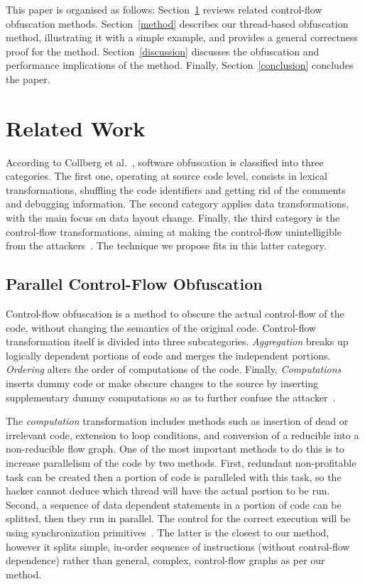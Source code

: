 \documentclass[3p,times,procedia,twocolumn,letterpaper]{elsarticle}
\begin{document}
This paper is organised as follows: Section~\ref{related} reviews related control-flow obfuscation methods. Section~\ref{method} describes our thread-based obfuscation method, illustrating it with a simple example, and provides a general correctness proof for the method. Section~\ref{discussion} discusses the obfuscation and performance implications of the method. Finally, Section~\ref{conclusion} concludes the paper.


\section{Related Work}
\label{related}

According to Collberg et
al.~\cite{d}, software obfuscation is classified into three
categories. The first one, operating at source code level, consists in lexical transformations, shuffling the code identifiers and getting rid of the comments and
debugging information. The second category applies data transformations, with the main focus on data layout change. Finally, the
third category is the control-flow transformations, aiming at making the control-flow unintelligible from the attackers~\cite{d,f}. The technique we propose fits in this latter category.








\subsection{Parallel Control-Flow Obfuscation}
Control-flow obfuscation is a method to obscure the actual
control-flow of the code, without changing the semantics of the
original code. Control-flow transformation itself is divided into three
subcategories. \emph{Aggregation} breaks up logically dependent portions
of code and merges the independent portions. \emph{Ordering} alters
the order of computations of the code. Finally, \emph{Computations}
inserts dummy code or make obscure changes to the source by inserting supplementary dummy computations so as to further confuse the attacker~\cite{d}.


The \emph{computation} transformation includes methods such as insertion of dead or irrelevant code, extension to loop conditions, and conversion of a reducible into a non-reducible flow graph. One of the most important methods to do this is to increase parallelism of the code by two methods. First, redundant non-profitable task can be created then a portion of code is paralleled with this task, so the hacker cannot deduce which thread will have the actual portion to be run. Second, a sequence of data dependent statements in a portion of code can be splitted, then they run in parallel. The control for the correct execution will be using synchronization primitives~\cite{e}. The latter is the closest to our method, however it splits simple, in-order sequence of instructions (without control-flow dependence) rather than general, complex, control-flow graphs as per our method.
\end{document}
